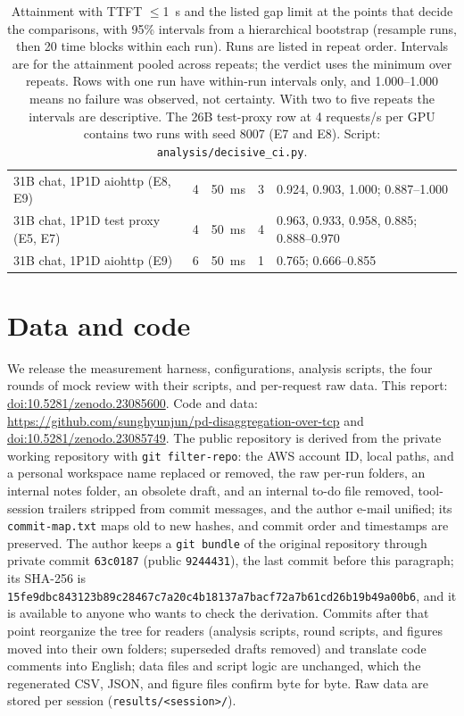\documentclass[11pt]{article}
\begin{document}
\begin{table}[H]
\begin{tabularx}{\linewidth}{Lllll}
31B chat, 1P1D aiohttp (E8, E9) & 4 & 50~ms & 3 & 0.924, 0.903, 1.000; 0.887--1.000 \\
31B chat, 1P1D test proxy (E5, E7) & 4 & 50~ms & 4 & 0.963, 0.933, 0.958, 0.885; 0.888--0.970 \\
31B chat, 1P1D aiohttp (E9) & 6 & 50~ms & 1 & 0.765; 0.666--0.855 \\
\bottomrule
\end{tabularx}
\caption{Attainment with TTFT $\le$1~s and the listed gap limit at the points that decide the comparisons, with 95\% intervals from a hierarchical bootstrap (resample runs, then 20 time blocks within each run). Runs are listed in repeat order. Intervals are for the attainment pooled across repeats; the verdict uses the minimum over repeats. Rows with one run have within-run intervals only, and 1.000--1.000 means no failure was observed, not certainty. With two to five repeats the intervals are descriptive. The 26B test-proxy row at 4 requests/s per GPU contains two runs with seed 8007 (E7 and E8). Script: \texttt{analysis/decisive\_ci.py}.}
\label{tab:ci}
\end{table}

\section{Data and code}\label{app:data}
We release the measurement harness, configurations, analysis scripts, the four rounds of mock review with their scripts, and per-request raw data. This report: \href{https://doi.org/10.5281/zenodo.23085600}{doi:10.5281/zenodo.23085600}. Code and data: \url{https://github.com/sunghyunjun/pd-disaggregation-over-tcp} and \href{https://doi.org/10.5281/zenodo.23085749}{doi:10.5281/zenodo.23085749}. The public repository is derived from the private working repository with \texttt{git filter-repo}: the AWS account ID, local paths, and a personal workspace name replaced or removed, the raw per-run folders, an internal notes folder, an obsolete draft, and an internal to-do file removed, tool-session trailers stripped from commit messages, and the author e-mail unified; its \texttt{commit-map.txt} maps old to new hashes, and commit order and timestamps are preserved. The author keeps a \texttt{git bundle} of the original repository through private commit \texttt{63c0187} (public \texttt{9244431}), the last commit before this paragraph; its SHA-256 is \texttt{15fe9dbc843123b89c28467c7a20c4b18137a7bacf72a7b61cd26b19b49a00b6}, and it is available to anyone who wants to check the derivation. Commits after that point reorganize the tree for readers (analysis scripts, round scripts, and figures moved into their own folders; superseded drafts removed) and translate code comments into English; data files and script logic are unchanged, which the regenerated CSV, JSON, and figure files confirm byte for byte. Raw data are stored per session (\texttt{results/\textless session\textgreater/}).
\end{document}
